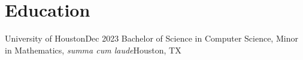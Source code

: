 \section{Education}
\resumeSubHeadingListStart
    \resumeSubheading
    {University of Houston}{Dec 2023}
    {Bachelor of Science in Computer Science, Minor in Mathematics, \textit{summa cum laude}}{Houston, TX}
    
\resumeSubHeadingListEnd
